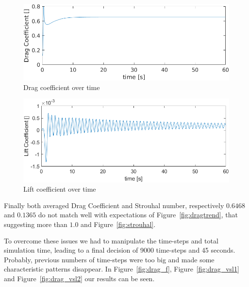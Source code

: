 \documentclass[12pt]{article}
\begin{document}
        \begin{figure}[!ht]
                \includegraphics[width=\textwidth]{Drag_Coefficient.png}
                \centering
                \caption{Drag coefficient over time}
                \label{fig:drag_coeff}
        \end{figure}
                \begin{figure}[!ht]
                \includegraphics[width=\textwidth]{Lift_Coefficient.png}
                \centering
                \caption{Lift coefficient over time}
                \label{fig:lift_coeff}
        \end{figure}


        Finally both averaged Drag Coefficient and Strouhal number, respectively  $\num{0.6468}$ and $0.1365$ do not match well with expectations of Figure~\ref{fig:dragtrend}, that suggesting more than $1.0$ and Figure~\ref{fig:strouhal}.
        
        To overcome these issues we had to manipulate the time-steps and total simulation time, leading to a final decision of 9000 time-steps and 45 seconds. Probably, previous numbers of time-steps were too big and made some characteristic patterns disappear. In Figure~\ref{fig:drag_f}, Figure~\ref{fig:drag_vsl1} and Figure~\ref{fig:drag_vsl2} our results can be seen. 
        
\end{document}
